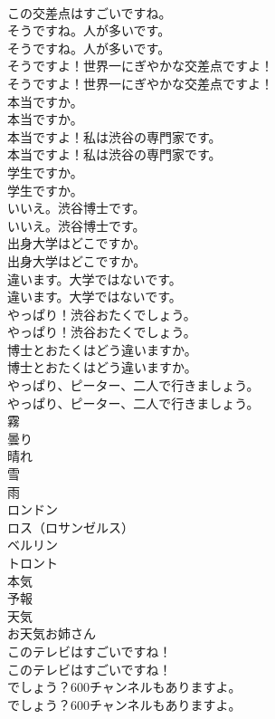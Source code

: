 \documentclass[8pt]{extreport}
\begin{document}
\begin{CJK}{UTF8}{min}
\\	この交差点はすごいですね。 
\\	そうですね。人が多いです。	
\\	そうですね。人が多いです。 
\\	そうですよ！世界一にぎやかな交差点ですよ！	
\\	そうですよ！世界一にぎやかな交差点ですよ！ 
\\	本当ですか。	
\\	本当ですか。 
\\	本当ですよ！私は渋谷の専門家です。	
\\	本当ですよ！私は渋谷の専門家です。 
\\	学生ですか。	
\\	学生ですか。 
\\	いいえ。渋谷博士です。	
\\	いいえ。渋谷博士です。 
\\	出身大学はどこですか。	
\\	出身大学はどこですか。 
\\	違います。大学ではないです。	
\\	違います。大学ではないです。 
\\	やっぱり！渋谷おたくでしょう。	
\\	やっぱり！渋谷おたくでしょう。 
\\	博士とおたくはどう違いますか。	
\\	博士とおたくはどう違いますか。 
\\	やっぱり、ピーター、二人で行きましょう。	
\\	やっぱり、ピーター、二人で行きましょう。 
\\	霧
\\	曇り
\\	晴れ
\\	雪
\\	雨
\\	ロンドン
\\	ロス（ロサンゼルス）
\\	ベルリン
\\	トロント
\\	本気
\\	予報
\\	天気
\\	お天気お姉さん
\\	このテレビはすごいですね！	
\\	このテレビはすごいですね！ 
\\	でしょう？600チャンネルもありますよ。	
\\	でしょう？600チャンネルもありますよ。 

\end{CJK}
\end{document}
